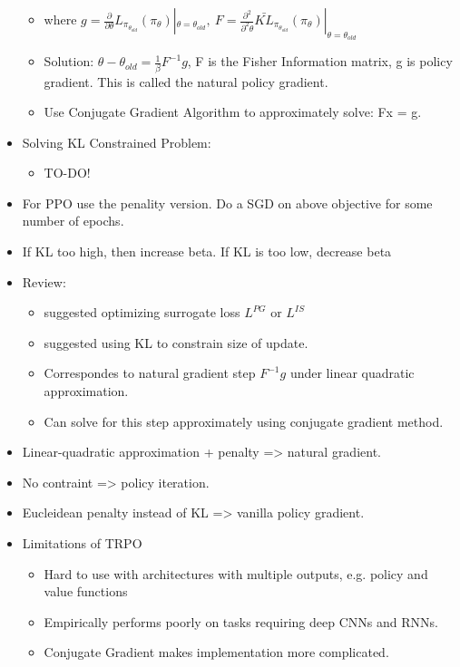 \begin{itemize}[noitemsep,nolistsep]
\begin{itemize}[noitemsep,nolistsep]
		\item where $g = \frac{\partial}{\partial \theta} L_{\pi_{\theta_{old}}}(\pi_\theta)|_{\theta = \theta_{old}},\ F = \frac{\partial^2}{\partial^2 \theta} \bar{KL}_{\pi_{\theta_{old}}}(\pi_\theta)|_{\theta = \theta_{old}}$
		\item Solution: $\theta - \theta_{old} = \frac{1}{\beta}F^{-1}g$, F is the Fisher Information matrix, g is policy gradient. This is called the natural policy gradient.
		\item Use Conjugate Gradient Algorithm to approximately solve: Fx = g. 
	\end{itemize}
	\item Solving KL Constrained Problem:
	\begin{itemize}[noitemsep,nolistsep]
		\item TO-DO!
	\end{itemize}
	\item For PPO use the penality version. Do a SGD on above objective for some number of epochs. 
	\item If KL too high, then increase beta. If KL is too low, decrease beta
	\item Review:
	\begin{itemize}[noitemsep,nolistsep]
		\item suggested optimizing surrogate loss $L^{PG}$ or $L^{IS}$
		\item suggested using KL to constrain size of update.
		\item Correspondes to natural gradient step $F^{-1}g$ under linear quadratic approximation.
		\item Can solve for this step approximately using conjugate gradient method.
	\end{itemize}
	\item Linear-quadratic approximation + penalty => natural gradient.
	\item No contraint => policy iteration.
	\item Eucleidean penalty instead of KL => vanilla policy gradient.
	\item Limitations of TRPO
	\begin{itemize}[noitemsep,nolistsep]
		\item Hard to use with architectures with multiple outputs, e.g. policy and value functions
		\item Empirically performs poorly on tasks requiring deep CNNs and RNNs.
		\item Conjugate Gradient makes implementation more complicated.

\end{itemize}
\end{itemize}
